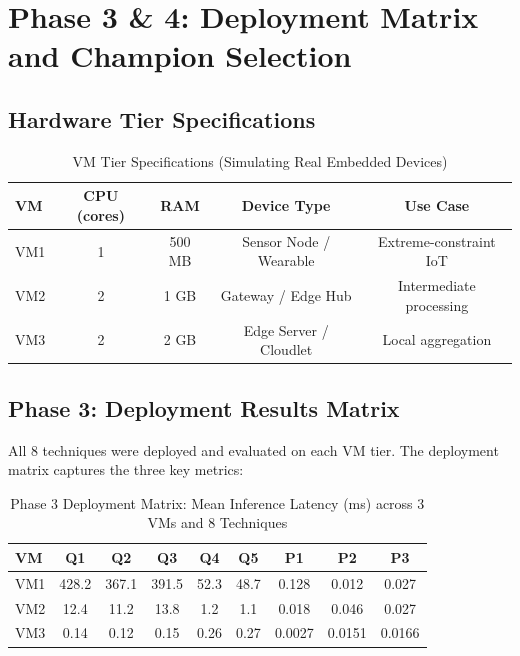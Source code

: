 \documentclass[12pt, a4paper]{article}
\begin{document}
\section{Phase 3 \& 4: Deployment Matrix and Champion Selection}

\subsection{Hardware Tier Specifications}

\begin{table}[H]
\centering
\caption{VM Tier Specifications (Simulating Real Embedded Devices)}
\begin{tabular}{lcccc}
\toprule
\textbf{VM} & \textbf{CPU (cores)} & \textbf{RAM} & \textbf{Device Type} & \textbf{Use Case} \\
\midrule
VM1 & 1 & 500 MB & Sensor Node / Wearable & Extreme-constraint IoT \\
VM2 & 2 & 1 GB & Gateway / Edge Hub & Intermediate processing \\
VM3 & 2 & 2 GB & Edge Server / Cloudlet & Local aggregation \\
\bottomrule
\end{tabular}
\label{tab:vm_specs}
\end{table}

\subsection{Phase 3: Deployment Results Matrix}

All 8 techniques were deployed and evaluated on each VM tier. The deployment matrix captures the three key metrics:

\begin{table}[H]
\centering
\caption{Phase 3 Deployment Matrix: Mean Inference Latency (ms) across 3 VMs and 8 Techniques}
\begin{tabular}{l|cccccccc}
\toprule
\textbf{VM} & Q1 & Q2 & Q3 & Q4 & Q5 & P1 & P2 & P3 \\
\midrule
VM1 & 428.2 & 367.1 & 391.5 & 52.3 & 48.7 & 0.128 & 0.012 & 0.027 \\
VM2 & 12.4 & 11.2 & 13.8 & 1.2 & 1.1 & 0.018 & 0.046 & 0.027 \\
VM3 & 0.14 & 0.12 & 0.15 & 0.26 & 0.27 & 0.0027 & 0.0151 & 0.0166 \\
\bottomrule
\end{tabular}
\label{tab:deployment_matrix}
\end{table}
\end{document}
